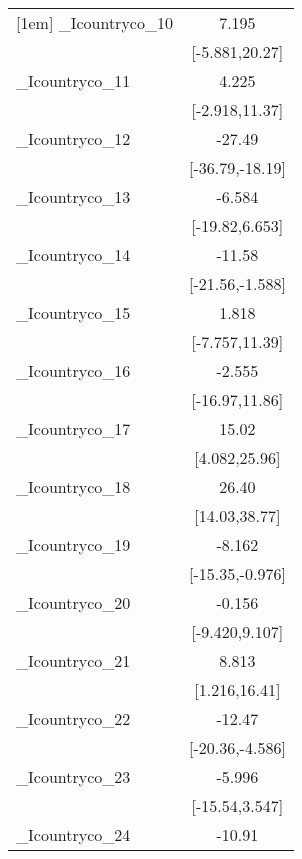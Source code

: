 {\begin{tabular}{l*{1}{c}}
[1em]
\_Icountryco\_10&                 7.195         \\
            &        [-5.881,20.27]         \\
[1em]
\_Icountryco\_11&                 4.225         \\
            &        [-2.918,11.37]         \\
[1em]
\_Icountryco\_12&                -27.49\sym{***}\\
            &       [-36.79,-18.19]         \\
[1em]
\_Icountryco\_13&                -6.584         \\
            &        [-19.82,6.653]         \\
[1em]
\_Icountryco\_14&                -11.58\sym{*}  \\
            &       [-21.56,-1.588]         \\
[1em]
\_Icountryco\_15&                 1.818         \\
            &        [-7.757,11.39]         \\
[1em]
\_Icountryco\_16&                -2.555         \\
            &        [-16.97,11.86]         \\
[1em]
\_Icountryco\_17&                 15.02\sym{**} \\
            &         [4.082,25.96]         \\
[1em]
\_Icountryco\_18&                 26.40\sym{***}\\
            &         [14.03,38.77]         \\
[1em]
\_Icountryco\_19&                -8.162\sym{*}  \\
            &       [-15.35,-0.976]         \\
[1em]
\_Icountryco\_20&                -0.156         \\
            &        [-9.420,9.107]         \\
[1em]
\_Icountryco\_21&                 8.813\sym{*}  \\
            &         [1.216,16.41]         \\
[1em]
\_Icountryco\_22&                -12.47\sym{**} \\
            &       [-20.36,-4.586]         \\
[1em]
\_Icountryco\_23&                -5.996         \\
            &        [-15.54,3.547]         \\
[1em]
\_Icountryco\_24&                -10.91\sym{*}  \\

\end{tabular}}

